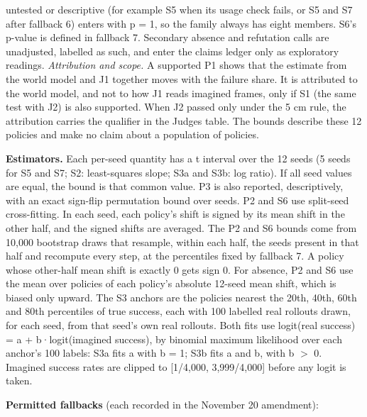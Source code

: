 \documentclass[10pt,letterpaper]{article}
\begin{document}
untested or descriptive (for example S5 when its usage check
fails, or S5 and S7 after fallback 6) enters with p = 1, so
the family always has eight members. S6's p-value is defined
in fallback 7. Secondary absence and refutation calls are
unadjusted, labelled as such, and enter the claims ledger
only as exploratory readings. \emph{Attribution and scope.}
A supported P1 shows that the estimate from the world model
and J1 together moves with the failure share. It is
attributed to the world model, and not to how J1 reads
imagined frames, only if S1 (the same test with J2) is also
supported. When J2 passed only under the 5 cm rule, the
attribution carries the qualifier in the Judges table. The
bounds describe these 12 policies and make no claim about a
population of policies.

\textbf{Estimators.} Each per-seed quantity has a t interval
over the 12 seeds (5 seeds for S5 and S7; S2: least-squares
slope; S3a and S3b: log ratio). If all seed values are
equal, the bound is that common value. P3 is also reported,
descriptively, with an exact sign-flip permutation bound
over seeds. P2 and S6 use split-seed cross-fitting. In each
seed, each policy's shift is signed by its mean shift in the
other half, and the signed shifts are averaged. The P2 and
S6 bounds come from 10,000 bootstrap draws that resample,
within each half, the seeds present in that half and
recompute every step, at the percentiles fixed by fallback
7. A policy whose other-half mean shift is exactly 0 gets
sign 0. For absence, P2 and S6 use the mean over policies of
each policy's absolute 12-seed mean shift, which is biased
only upward. The S3 anchors are the policies nearest the
20th, 40th, 60th and 80th percentiles of true success, each
with 100 labelled real rollouts drawn, for each seed, from
that seed's own real rollouts. Both fits use logit(real
success) = a + b·logit(imagined success), by binomial
maximum likelihood over each anchor's 100 labels: S3a fits a
with b = 1; S3b fits a and b, with b \ensuremath{>} 0.
Imagined success rates are clipped to {[}1/4,000,
3,999/4,000{]} before any logit is taken.

\textbf{Permitted fallbacks} (each recorded in the November
20 amendment):
\end{document}
